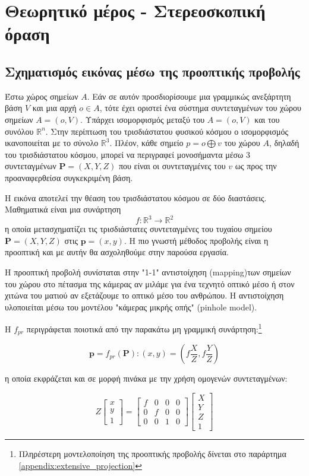 \g
\chapter{Θεωρητικό μέρος - Στερεοσκοπική όραση}
\label{Chapter2}

\section{Σχηματισμός εικόνας μέσω της προοπτικής προβολής}

Έστω χώρος σημείων $A$. Εάν σε αυτόν προσδιορίσουμε μια γραμμικώς ανεξάρτητη βάση $ V $ και μια αρχή $ o \in A $, τότε έχει οριστεί ένα σύστημα συντεταγμένων του χώρου σημείων $A = (o,V) $. Υπάρχει ισομορφισμός μεταξύ του $A = (o,V) $ και του συνόλου $\mathbb{R}^n$. Στην περίπτωση του τρισδιάστατου φυσικού κόσμου ο ισομορφισμός ικανοποιείται με το σύνολο $\mathbb{R}^3$. Πλέον, κάθε σημείο $ p = o \bigoplus v $ του χώρου $Α$, δηλαδή του τρισδιάστατου κόσμου, μπορεί να περιγραφεί μονοσήμαντα μέσω 3 συντεταγμένων $ \mathbf{P} = (X,Y,Z)$ που είναι οι συντεταγμένες του $v$ ως προς την προαναφερθείσα συγκεκριμένη βάση. 
 
Η εικόνα αποτελεί την θέαση του τρισδιάστατου κόσμου σε δύο διαστάσεις. Μαθηματικά είναι μια συνάρτηση $$ f : \mathbb{R}^3 \rightarrow \mathbb{R}^2 $$ η οποία μετασχηματίζει τις τρισδιάστατες συντεταγμένες του τυχαίου σημείου $\mathbf{P} = (X,Y,Z)$ στις $ \mathbf{p} = (x,y)$. Η πιο γνωστή μέθοδος προβολής είναι η προοπτική και με αυτήν θα ασχοληθούμε στην παρούσα εργασία.

Η προοπτική προβολή συνίσταται στην "1-1" αντιστοίχηση \e(mapping)\g των σημείων του χώρου στο πέτασμα της κάμερας αν μιλάμε για ένα τεχνητό οπτικό μέσο ή στον χιτώνα του ματιού αν εξετάζουμε το οπτικό μέσο του ανθρώπου. Η αντιστοίχηση υλοποιείται μέσω του μοντέλου "κάμερας μικρής οπής" \e (pinhole model). \g 

Η $f_{pr}$ περιγράφεται ποιοτικά από την παρακάτω μη γραμμική συνάρτηση:\footnote{Πληρέστερη μοντελοποίηση της προοπτικής προβολής δίνεται στο παράρτημα \ref{appendix:extensive_projection}}

\begin{equation}
	\mathbf{p} = f_{pr}(\mathbf{P}) : (x,y) = \left(f\frac{X}{Z}, f\frac{Y}{Z}\right)
\end{equation} 

η οποία εκφράζεται και σε μορφή πινάκα με την χρήση ομογενών συντεταγμένων:

\begin{equation}
Z\begin{bmatrix}x \\ y \\ 1\end{bmatrix} = 
\begin{bmatrix}
f & 0 & 0 & 0\\
0 & f & 0 & 0\\
0 & 0 & 1 & 0 
\end{bmatrix} 
\begin{bmatrix}
X \\ Y \\ Z \\ 1
\end{bmatrix}
\end{equation}

